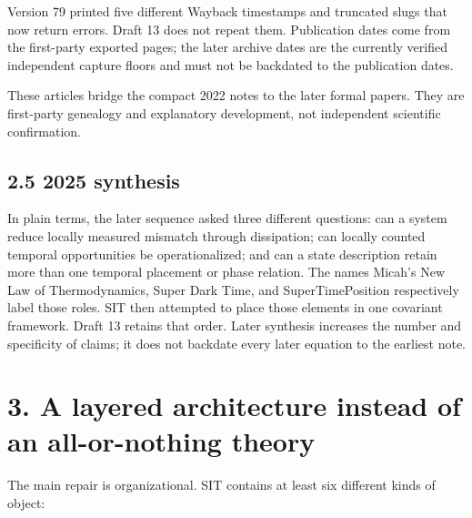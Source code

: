 \documentclass[
  american,
  11pt,
  letterpaper,
]{article}
\begin{document}
Version 79 printed five different Wayback timestamps and truncated slugs that now return errors. Draft 13 does not repeat them. Publication dates come from the first-party exported pages; the later archive dates are the currently verified independent capture floors and must not be backdated to the publication dates.

These articles bridge the compact 2022 notes to the later formal papers. They are first-party genealogy and explanatory development, not independent scientific confirmation.

\subsection{2.5 2025 synthesis}\label{synthesis}

In plain terms, the later sequence asked three different questions: can a system reduce locally measured mismatch through dissipation; can locally counted temporal opportunities be operationalized; and can a state description retain more than one temporal placement or phase relation. The names Micah's New Law of Thermodynamics, Super Dark Time, and SuperTimePosition respectively label those roles. SIT then attempted to place those elements in one covariant framework. Draft 13 retains that order. Later synthesis increases the number and specificity of claims; it does not backdate every later equation to the earliest note.

\section{3. A layered architecture instead of an all-or-nothing theory}\label{a-layered-architecture-instead-of-an-all-or-nothing-theory}

The main repair is organizational. SIT contains at least six different kinds of object:
\end{document}
